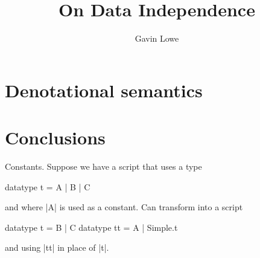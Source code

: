 \documentclass[12pt,a4paper]{article}
\title{On Data Independence}
\author{Gavin Lowe}
\begin{document}
\maketitle








\section{Denotational semantics}

\section{Conclusions}

Constants.  Suppose we have a script that uses a type
\begin{cspm}
datatype t = A | B | C
\end{cspm}
and where |A| is used as a constant.
Can transform into a script 
\begin{cspm}
datatype t = B | C
datatype tt = A | Simple.t
\end{cspm}
and using |tt| in place of |t|.

\appendix
%





\end{document}
